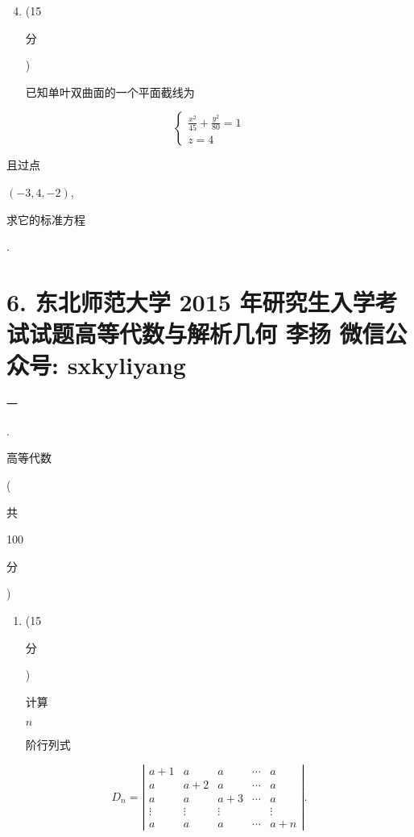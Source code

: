\documentclass[10pt]{article}
\begin{document}
\begin{enumerate}
  \setcounter{enumi}{3}
  \item (15 \begin{CJK}{UTF8}{mj}分\end{CJK}) \begin{CJK}{UTF8}{mj}已知单叶双曲面的一个平面截线为\end{CJK}
\end{enumerate}
$$
\left\{\begin{array}{l}
\frac{x^{2}}{45}+\frac{y^{2}}{80}=1 \\
z=4
\end{array}\right.
$$
\begin{CJK}{UTF8}{mj}且过点\end{CJK} $(-3,4,-2)$, \begin{CJK}{UTF8}{mj}求它的标准方程\end{CJK}.

\section{6. 东北师范大学 2015 年研究生入学考试试题高等代数与解析几何 
 李扬 
 微信公众号: sxkyliyang}
\begin{CJK}{UTF8}{mj}一\end{CJK}. \begin{CJK}{UTF8}{mj}高等代数\end{CJK} (\begin{CJK}{UTF8}{mj}共\end{CJK} 100 \begin{CJK}{UTF8}{mj}分\end{CJK})

\begin{enumerate}
  \item (15 \begin{CJK}{UTF8}{mj}分\end{CJK}) \begin{CJK}{UTF8}{mj}计算\end{CJK} $n$ \begin{CJK}{UTF8}{mj}阶行列式\end{CJK}
\end{enumerate}
$$
D_{n}=\left|\begin{array}{ccccc}
a+1 & a & a & \cdots & a \\
a & a+2 & a & \cdots & a \\
a & a & a+3 & \cdots & a \\
\vdots & \vdots & \vdots & & \vdots \\
a & a & a & \cdots & a+n
\end{array}\right| .
$$
\end{document}
